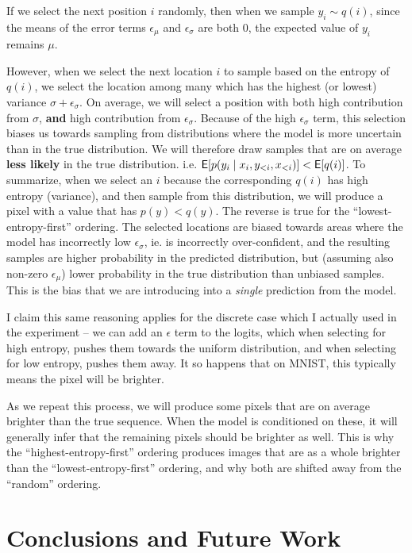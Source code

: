 If we select the next position $i$ randomly, then when we sample $y_i \sim q(i)$, since the means of the error terms $\epsilon_\mu$ and $\epsilon_\sigma$ are both 0, the expected value of $y_i$ remains $\mu$.

However, when we select the next location $i$ to sample based on the entropy of $q(i)$, we select the location among many which has the highest (or lowest) variance $\sigma + \epsilon_\sigma$. On average, we will select a position with both high contribution from $\sigma$, \textbf{and} high contribution  from $\epsilon_\sigma$. Because of the high $\epsilon_\sigma$ term, this selection biases us towards sampling from distributions where the model is more uncertain than in the true distribution. We will therefore draw samples that are on average \textbf{less likely} in the true distribution. i.e. $\mathsf{E}[p(y_i \mid x_i, y_{<i}, x_{<i})] < \mathsf{E}[q(i)]$. To summarize, when we select an $i$ because the corresponding $q(i)$ has high entropy (variance), and then sample from this distribution, we will produce a pixel with a value that has $p(y) < q(y)$. The reverse is true for the ``lowest-entropy-first'' ordering. The selected locations are biased towards areas where the model has incorrectly low $\epsilon_\sigma$, ie. is incorrectly over-confident, and the resulting samples are higher probability in the predicted distribution, but (assuming also non-zero $\epsilon_\mu$) lower probability in the true distribution than unbiased samples. This is the bias that we are introducing into a \textit{single} prediction from the model.

I claim this same reasoning applies for the discrete case which I actually used in the experiment -- we can add an $\epsilon$ term to the logits, which when selecting for high entropy, pushes them towards the uniform distribution, and when selecting for low entropy, pushes them away. It so happens that on MNIST, this typically means the pixel will be brighter.

As we repeat this process, we will produce some pixels that are on average brighter than the true sequence. When the model is conditioned on these, it will generally infer that the remaining pixels should be brighter as well. This is why the ``highest-entropy-first'' ordering produces images that are as a whole brighter than the ``lowest-entropy-first'' ordering, and why both are shifted away from the ``random'' ordering.

\section{Conclusions and Future Work}
\label{s:a-o-conclusions}

